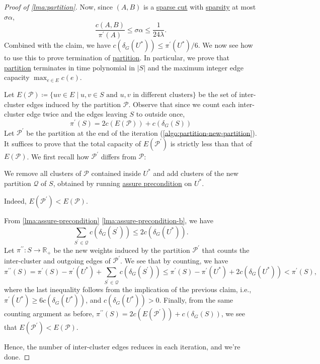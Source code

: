 \begin{proof}[Proof of \autoref{lma:partition}]
	Now, since \((A, B)\) is a \hyperref[prb:non-uniform-sparsest-cut]{sparse cut} with \hyperref[def:sparsity]{sparsity} at most \(\sigma \alpha \),
	\[
		\frac{c(A, B)}{\pi ^{\prime} (A)}
		\leq \sigma \alpha
		\leq \frac{1}{24\lambda }.
	\]
	Combined with the claim, we have \(c(\delta _G(U^{\ast} )) \leq \pi ^{\prime} (U^{\ast} ) / 6\). We now see how to use this to prove termination of \hyperref[algo:partition]{partition}. In particular, we prove that \hyperref[algo:partition]{partition} terminates in time polynomial in \(\lvert S \rvert \) and the maximum integer edge capacity \(\max _{e \in E} c(e)\).

	Let \(E(\mathcal{P} ) \coloneqq \{ uv \in E  \mid u, v \in S \text{ and } u, v \text{ in different clusters} \} \) be the set of inter-cluster edges induced by the partition \(\mathcal{P} \). Observe that since we count each inter-cluster edge twice and the edges leaving \(S\) to outside once,
	\[
		\pi ^{\prime} (S)
		= 2c(E(\mathcal{P} ))+ c(\delta _G(S))
	\]
	Let \(\mathcal{P} ^{\prime} \) be the partition at the end of the iteration (\autoref{algo:partition-new-partition}). It suffices to prove that the total capacity of \(E(\mathcal{P} ^{\prime} )\) is strictly less than that of \(E(\mathcal{P} )\). We first recall how \(\mathcal{P} ^{\prime} \) differs from \(\mathcal{P} \):
	\begin{prev}
		We remove all clusters of \(\mathcal{P} \) contained inside \(U^{\ast} \) and add clusters of the new partition \(\mathcal{Q} \) of \(S\), obtained by running \hyperref[algo:assure-precondition]{assure precondition} on \(U^{\ast} \).
	\end{prev}

	\begin{claim}
		Indeed, \(E(\mathcal{P} ^{\prime} ) < E(\mathcal{P} )\).
	\end{claim}
	\begin{explanation}
		From \autoref{lma:assure-precondition} \autoref{lma:assure-precondition-b}, we have
		\[
			\sum_{S^{\prime} \in \mathcal{Q} } c(\delta _G(S^{\prime} ))
			\leq 2 c(\delta _G(U^{\ast} )).
		\]
		Let \(\pi ^{\prime\prime} \colon S \to \mathbb{R} _{+}\) be the new weights induced by the partition \(\mathcal{P} ^{\prime} \) that counts the inter-cluster and outgoing edges of \(\mathcal{P} ^{\prime} \). We see that by counting, we have
		\[
			\pi ^{\prime\prime} (S)
			= \pi ^{\prime} (S) - \pi ^{\prime} (U^{\ast} ) + \sum_{S^{\prime} \in \mathcal{Q} } c(\delta _G(S^{\prime} ))
			\leq \pi ^{\prime} (S) - \pi ^{\prime} (U^{\ast} ) + 2c (\delta _G(U^{\ast} ))
			< \pi ^{\prime} (S),
		\]
		where the last inequality follows from the implication of the previous claim, i.e., \(\pi ^{\prime} (U^{\ast} ) \geq 6c(\delta _G(U^{\ast} ))\), and \(c(\delta _G(U^{\ast} )) > 0\). Finally, from the same counting argument as before, \(\pi ^{\prime\prime} (S) = 2c(E(\mathcal{P} ^{\prime} )) + c(\delta _G(S))\), we see that \(E(\mathcal{P} ^{\prime} ) < E(\mathcal{P} )\).
	\end{explanation}
	Hence, the number of inter-cluster edges reduces in each iteration, and we're done.
\end{proof}
